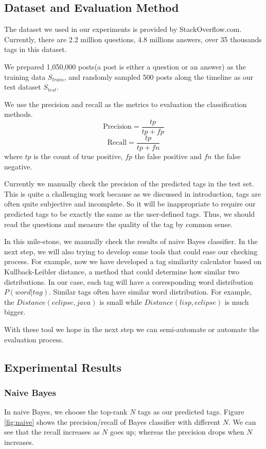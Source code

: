 
\subsection{Dataset and Evaluation Method}
The dataset we used in our experiments is provided by StackOverflow.com. Currently, there are 2.2 million questions, 4.8 millions answers, over 35 thousands tags in this dataset\cite{DataDump}.

We prepared 1,050,000 posts(a post is either a question or an answer)  as the training data $S_{train}$, and randomly sampled 500 posts along the timeline as our test dataset $S_{test}$.

We use the precision and recall as the metrics to evaluation the classification methods.
$$ \text{Precision}=\frac{tp}{tp+fp} $$
$$ \text{Recall}=\frac{tp}{tp+fn} $$
where $tp$ is the count of true positive, $fp$ the false positive and $fn$ the false negative.

Currently we manually check the precision of the predicted tags in the test set. This is quite a challenging work because as we discussed in introduction, tags are often quite subjective and incomplete. So it will be inappropriate to require our predicted tags to be exactly the same as the user-defined tags. Thus, we should read the questions and measure the quality of the tag by common sense. 

In this mile-stone, we manually check the results of naive Bayes classifier. In the next step, we will also trying to develop some tools that could ease our checking process. For example, now we have developed a tag similarity calculator based on Kullback-Leibler distance, a method that could determine how similar two 
distributions. In our case, each tag will have a corresponding word distribution $P(word|tag)$. Similar tags often have similar word distribution. For example, the $Distance(eclipse, java)$ is small while $Distance(lisp, eclipse)$ is much bigger.

With these tool we hope in the next step we can semi-automate or automate the evaluation process.

\subsection{Experimental Results}
\subsubsection{Naive Bayes}
In naive Bayes, we choose the top-rank $N$ tags as our predicted tags. Figure \ref{fig:naive} shows the precision/recall of Bayes classifier with different $N$. We can see that the recall increases as $N$ goes up; whereas the precision drops when $N$ increases.

